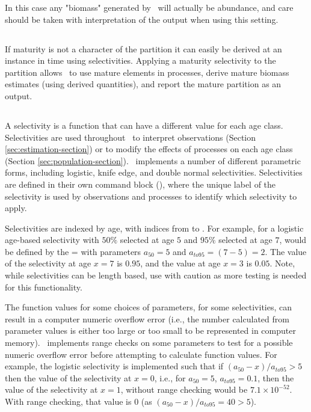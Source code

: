 In this case any "biomass" generated by \CNAME\ will actually be abundance, and care should be taken with interpretation of the output when using this setting.

\subsection{\label{sec:maturity-notinpartition}}

If maturity is not a character of the partition it can easily be derived at an instance in time using selectivities. Applying a maturity selectivity to the partition allows \CNAME\ to use mature elements in processes, derive mature biomass estimates (using derived quantities), and report the mature partition as an output.

\subsection{\label{sec:selectivities}}

A selectivity is a function that can have a different value for each age class. Selectivities are used throughout \CNAME\ to interpret observations (Section \ref{sec:estimation-section}) or to modify the effects of processes on each age class (Section \ref{sec:population-section}). \CNAME\ implements a number of different parametric forms, including logistic, knife edge, and double normal selectivities. Selectivities are defined in their own command block (), where the unique label of the selectivity is used by observations and processes to identify which selectivity to apply.

Selectivities are indexed by age, with indices from  to . For example, for a logistic age-based selectivity with $50\%$ selected at age $5$ and $95\%$ selected at age $7$, would be defined by the = with parameters $a_{50}=5$ and $a_{to95}=(7-5)=2$. The value of the selectivity at age $x=7$ is $0.95$, and the value at age $x=3$ is $0.05$. Note, while selectivities can be length based, use with caution as more testing is needed for this functionality.

The function values for some choices of parameters, for some selectivities, can result in a computer numeric overflow error (i.e., the number calculated from parameter values is either too large or too small to be represented in computer memory). \CNAME\ implements range checks on some parameters to test for a possible numeric overflow error before attempting to calculate function values. For example, the logistic selectivity is implemented such that if $(a_{50}-x)/a_{to95} > 5$ then the value of the selectivity at $x=0$, i.e., for $a_{50}=5$, $a_{to95}=0.1$, then the value of the selectivity at $x=1$, without range checking would be $7.1 \times 10^{-52}$. With range checking, that value is $0$ (as $(a_{50}-x)/a_{to95}=40 > 5$).

